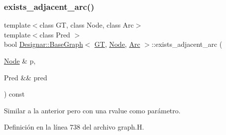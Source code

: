 \mbox{\label{class_designar_1_1_base_graph_a16d3fbb089265c1dc8da8ffbe2fb1434}} 
\subsubsection{\texorpdfstring{exists\+\_\+adjacent\+\_\+arc()}{exists\_adjacent\_arc()}\hspace{0.1cm}{\footnotesize\ttfamily [2/2]}}
{\footnotesize\ttfamily template$<$class GT, class Node, class Arc$>$ \\
template$<$class Pred $>$ \\
bool \hyperlink{class_designar_1_1_base_graph}{Designar\+::\+Base\+Graph}$<$ \hyperlink{demo-buildgraph_8_c_a3001c40d2c31ca87ed96cd7d1334a55e}{GT}, \hyperlink{namespace_designar_a5af326c65aa2bd26b26c410f2030d09e}{Node}, \hyperlink{namespace_designar_a3f55fb5513d62ff47cbc8f72b8e95d6f}{Arc} $>$\+::exists\+\_\+adjacent\+\_\+arc (\begin{DoxyParamCaption}\item[{\hyperlink{namespace_designar_a5af326c65aa2bd26b26c410f2030d09e}{Node} \&}]{p,  }\item[{Pred \&\&}]{pred }\end{DoxyParamCaption}) const\hspace{0.3cm}{\ttfamily [inline]}}



Similar a la anterior pero con una rvalue como parámetro. 



Definición en la línea 738 del archivo graph.\+H.

\mbox{\label{class_designar_1_1_base_graph_aaed186c42ed6b51f761cda959ecde601}} 
